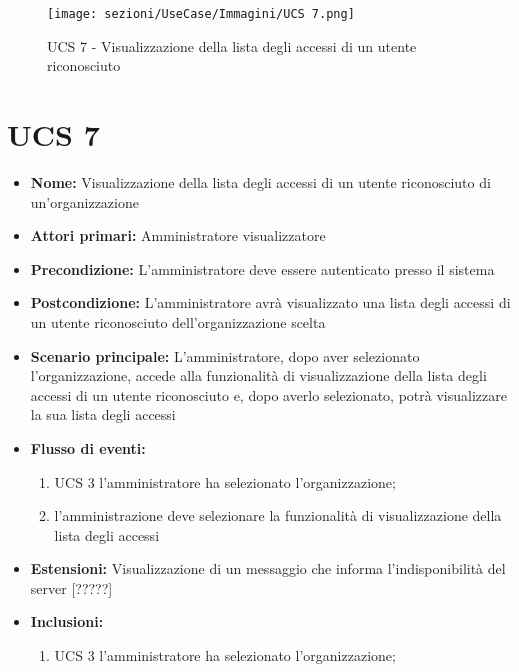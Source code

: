 \begin{figure}[h]
\centering
\texttt{[image: sezioni/UseCase/Immagini/UCS 7.png]}%
\caption{UCS 7 - Visualizzazione della lista degli accessi di un utente riconosciuto}
\label{logo}
\end{figure}

\section{UCS 7}%
\begin{itemize}
\item \textbf{Nome:} Visualizzazione della lista degli accessi di un utente riconosciuto di un'organizzazione
\item \textbf{Attori primari:} Amministratore visualizzatore
\item \textbf{Precondizione:} L’amministratore deve essere autenticato presso il sistema
\item \textbf{Postcondizione:} L’amministratore avrà visualizzato una lista degli accessi di un utente riconosciuto dell'organizzazione scelta
\item \textbf{Scenario principale:} L’amministratore, dopo aver selezionato l'organizzazione, accede alla funzionalità di visualizzazione della lista degli accessi di un utente riconosciuto e, dopo averlo selezionato, potrà visualizzare la sua lista degli accessi
\item \textbf{Flusso di eventi:} 
\begin{enumerate}
	\item UCS 3 l'amministratore ha selezionato l'organizzazione;
	\item l'amministrazione deve selezionare la funzionalità di visualizzazione della lista degli accessi
\end{enumerate}
\item \textbf{Estensioni:} Visualizzazione di un messaggio che informa l’indisponibilità del server [?????]
\item \textbf{Inclusioni:}
\begin{enumerate}
	\item UCS 3 l'amministratore ha selezionato l'organizzazione;
\end{enumerate}
\end{itemize}

